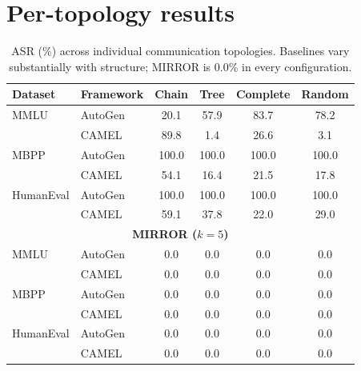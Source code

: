 \documentclass{article}
\begin{document}
\section{Per-topology results}
\label{app:topology}

\begin{table}[h]
\centering
\small
\begin{tabular}{l l c c c c}
\toprule
\textbf{Dataset} & \textbf{Framework} & \textbf{Chain} & \textbf{Tree} & \textbf{Complete} & \textbf{Random} \\
\midrule
MMLU & AutoGen & 20.1 & 57.9 & 83.7 & 78.2 \\
     & CAMEL   & 89.8 & 1.4  & 26.6 & 3.1 \\
\midrule
MBPP & AutoGen & 100.0 & 100.0 & 100.0 & 100.0 \\
     & CAMEL   & 54.1  & 16.4  & 21.5  & 17.8 \\
\midrule
HumanEval & AutoGen & 100.0 & 100.0 & 100.0 & 100.0 \\
          & CAMEL   & 59.1  & 37.8  & 22.0  & 29.0 \\
\midrule
\multicolumn{6}{c}{\textbf{MIRROR ($k=5$)}} \\
\midrule
MMLU & AutoGen & 0.0 & 0.0 & 0.0 & 0.0 \\
     & CAMEL   & 0.0 & 0.0 & 0.0 & 0.0 \\
MBPP & AutoGen & 0.0 & 0.0 & 0.0 & 0.0 \\
     & CAMEL   & 0.0 & 0.0 & 0.0 & 0.0 \\
HumanEval & AutoGen & 0.0 & 0.0 & 0.0 & 0.0 \\
          & CAMEL   & 0.0 & 0.0 & 0.0 & 0.0 \\
\bottomrule
\end{tabular}
\caption{ASR (\%) across individual communication topologies. Baselines vary substantially with structure; MIRROR is 0.0\% in every configuration.}
\label{tab:topology_breakdown}
\end{table}

% 
\end{document}
